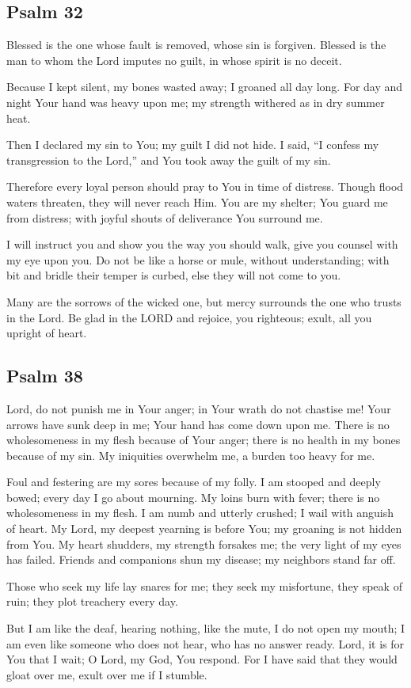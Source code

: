 \documentclass[12pt]{article}
\newcommand{\prayertitle}[1]{\subsection{#1}}
\newcommand{\indulgencedprayertitle}[1]{\prayertitle{#1 \protect\kreuz}}
\begin{document}
\indulgencedprayertitle{Psalm 32}
Blessed is the one whose fault is removed, whose sin is forgiven.
Blessed is the man to whom the Lord imputes no guilt, in whose spirit is no deceit.

Because I kept silent, my bones wasted away;
I groaned all day long.
For day and night Your hand was heavy upon me;
my strength withered as in dry summer heat.

Then I declared my sin to You;
my guilt I did not hide.
I said, ``I confess my transgression to the Lord,'' and You took away the guilt of my sin.

Therefore every loyal person should pray to You in time of distress.
Though flood waters threaten, they will never reach Him.
You are my shelter; You guard me from distress;
with joyful shouts of deliverance You surround me.

I will instruct you and show you the way you should walk, give you counsel with my eye upon you.
Do not be like a horse or mule, without understanding;
with bit and bridle their temper is curbed, else they will not come to you.

Many are the sorrows of the wicked one, but mercy surrounds the one who trusts in the Lord.
Be glad in the LORD and rejoice, you righteous;
exult, all you upright of heart.

\indulgencedprayertitle{Psalm 38}
Lord, do not punish me in Your anger;
in Your wrath do not chastise me!
Your arrows have sunk deep in me;
Your hand has come down upon me.
There is no wholesomeness in my flesh because of Your anger;
there is no health in my bones because of my sin.
My iniquities overwhelm me, a burden too heavy for me.

Foul and festering are my sores because of my folly.
I am stooped and deeply bowed;
every day I go about mourning.
My loins burn with fever;
there is no wholesomeness in my flesh.
I am numb and utterly crushed;
I wail with anguish of heart.
My Lord, my deepest yearning is before You;
my groaning is not hidden from You.
My heart shudders, my strength forsakes me;
the very light of my eyes has failed.
Friends and companions shun my disease;
my neighbors stand far off.

Those who seek my life lay snares for me;
they seek my misfortune, they speak of ruin;
they plot treachery every day.

But I am like the deaf, hearing nothing, like the mute, I do not open my mouth;
I am even like someone who does not hear, who has no answer ready.
Lord, it is for You that I wait;
O Lord, my God, You respond.
For I have said that they would gloat over me, exult over me if I stumble.
\end{document}
